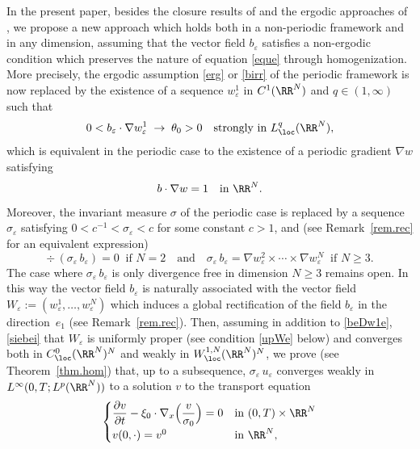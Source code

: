 In the present paper, besides the closure results of \cite{AHZ1,AHZ2,AHZ3} and the ergodic approaches of \cite{Bre,HoXi,Gol1,Gol2,Tas}, we propose a new approach which holds both in a non-periodic framework and in any dimension, assuming that the vector field $b_\varepsilon$ satisfies a non-ergodic condition which preserves the nature of equation \eqref{eque} through homogenization.
More precisely, the ergodic assumption \eqref{erg} or \eqref{birr} of the periodic framework
is now replaced by the existence of a sequence $w_\varepsilon^1$ in $C^1(\RR^N)$ and $q\in(1,\infty)$ such that
\begin{equation}\label{beDw1e}
0< b_\varepsilon\cdot\nabla w_\varepsilon^1\;\to\;\theta_0>0\quad\mbox{strongly in }L^q_\loc(\RR^N),
\end{equation}
which is equivalent in the periodic case to the existence of a periodic gradient $\nabla w$ satisfying
\begin{equation}\label{bDw1}
b\cdot\nabla w=1\quad\mbox{in }\RR^N.
\end{equation}
Moreover, the invariant measure $\sigma$ of the periodic case is replaced by a sequence $\sigma_\varepsilon$ satisfying $0<c^{-1}<\sigma_\varepsilon<c$ for some constant $c>1$, and (see Remark~\ref{rem.rec} for an equivalent expression)
\begin{equation}\label{siebei}
\div\,(\sigma_\varepsilon\,b_\varepsilon)=0\;\;\mbox{if }N=2\quad\mbox{and}\quad \sigma_\varepsilon\,b_\varepsilon=\nabla w_\varepsilon^2\times\cdots\times \nabla w_\varepsilon^N\;\;\mbox{if }N\geq 3.
\end{equation}
The case where $\sigma_\varepsilon\,b_\varepsilon$ is only divergence free in dimension $N\geq 3$ remains open.
In this way the vector field $b_\varepsilon$ is naturally associated with the vector field $W_\varepsilon:=(w_\varepsilon^1,\dots, w_\varepsilon^N)$ which induces a global rectification of the field $b_\varepsilon$ in the direction~$e_1$ (see Remark~\ref{rem.rec}). Then, assuming in addition to \eqref{beDw1e}, \eqref{siebei} that $W_\varepsilon$ is uniformly proper (see condition \eqref{upWe} below) and converges both in $C^0_\loc(\RR^N)^N$ and weakly in $W^{1,N}_\loc(\RR^N)^N$, we prove (see Theorem~\ref{thm.hom}) that, up to a subsequence, $\sigma_\varepsilon\,u_\varepsilon$ converges weakly in $L^\infty(0,T;L^p(\RR^N))$ to a solution $v$ to the transport equation
\begin{equation}\label{eqvi}
\begin{cases}
\dfrac{\partial v}{\partial t}-\xi_0\cdot\nabla_x\Bigl(\dfrac{v}{\sigma_0}\Bigr)=0 & \mbox{in }(0,T)\times\RR^N
\\[5pt]
v(0,\cdot)=v^0 & \mbox{in }\RR^N,
\end{cases}
\end{equation}
